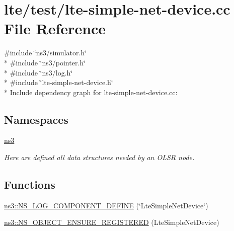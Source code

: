 \hypertarget{lte-simple-net-device_8cc}{}\section{lte/test/lte-\/simple-\/net-\/device.cc File Reference}
\label{lte-simple-net-device_8cc}
{\ttfamily \#include \char`\"{}ns3/simulator.\+h\char`\"{}}\\*
{\ttfamily \#include \char`\"{}ns3/pointer.\+h\char`\"{}}\\*
{\ttfamily \#include \char`\"{}ns3/log.\+h\char`\"{}}\\*
{\ttfamily \#include \char`\"{}lte-\/simple-\/net-\/device.\+h\char`\"{}}\\*
Include dependency graph for lte-\/simple-\/net-\/device.cc\+:
\subsection*{Namespaces}
\begin{DoxyCompactItemize}
\item 
 \hyperlink{namespacens3}{ns3}
\begin{DoxyCompactList}\small\item\em Here are defined all data structures needed by an O\+L\+SR node. \end{DoxyCompactList}\end{DoxyCompactItemize}
\subsection*{Functions}
\begin{DoxyCompactItemize}
\item 
\hyperlink{namespacens3_a00b03fbd5fa06657b677fd3569412088}{ns3\+::\+N\+S\+\_\+\+L\+O\+G\+\_\+\+C\+O\+M\+P\+O\+N\+E\+N\+T\+\_\+\+D\+E\+F\+I\+NE} (\char`\"{}Lte\+Simple\+Net\+Device\char`\"{})
\item 
\hyperlink{namespacens3_aeb8adf96733045cbfacd302bdcb2454a}{ns3\+::\+N\+S\+\_\+\+O\+B\+J\+E\+C\+T\+\_\+\+E\+N\+S\+U\+R\+E\+\_\+\+R\+E\+G\+I\+S\+T\+E\+R\+ED} (Lte\+Simple\+Net\+Device)
\end{DoxyCompactItemize}
